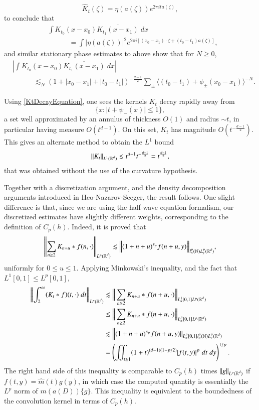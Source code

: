 \[ \widehat{K}_t(\zeta) = \eta(a(\zeta)) e^{2 \pi i t a(\zeta)}, \]
%
to conclude that
%
\begin{align*}
    &\int K_{t_0}(x - x_0) \overline{K_{t_1}(x - x_1)}\; dx\\
    &\quad\quad\quad= \int |\eta(a(\zeta))|^2 e^{2 \pi i [ (x_0 - x_1) \cdot \zeta + (t_0 - t_1) a(\zeta) ]},
\end{align*}
%
and similar stationary phase estimates to above show that for $N \geq 0$,
%
\begin{align*}
    & \left| \int K_{t_0}(x - x_0) \overline{K_{t_1}(x - x_1)}\; dx \right|\\
    &\quad\quad\quad \lesssim_N (1 + |x_0 - x_1| + |t_0 - t_1|)^{- \frac{d-1}{2}} \sum_{\pm} \langle (t_0 - t_1) + \phi_{\pm}(x_0 - x_1) \rangle^{-N}.
\end{align*}

\begin{remark}
    Using \eqref{KtDecayEquation}, one sees the kernels $K_t$ decay rapidly away from
    \[ \{ x : |t + \psi_-(x)| \leq 1 \}, \]
    a set well approximated by an annulus of thickness $O(1)$ and radius $\sim t$, in particular having measure $O(t^{d-1})$. On this set, $K_t$ has magnitude $O(t^{-\frac{d-1}{2}})$. This gives an alternate method to obtain the $L^1$ bound
    \[ \| K_t \|_{L^1(\operatorname{\mathbb{R}}^d)} \lesssim t^{d-1} t^{- \frac{d-1}{2}} = t^{\frac{d-1}{2}}, \]
    that was obtained without the use of the curvature hypothesis.
\end{remark}

Together with a discretization argument, and the density decomposition arguments introduced in Heo-Nazarov-Seeger, the result follows. One slight difference is that, since we are using the half-wave equation formalism, our discretized estimates have slightly different weights, corresponding to the definition of $C_p(h)$. Indeed, it is proved that
%
\[ \left\| \sum_{n \geq 2} K_{n + u} * f(n, \cdot) \right\|_{L^p(\operatorname{\mathbb{R}}^d)} \lesssim \Big\| (1 + n + u)^{s_p} f(n + u,y) \Big\|_{l^p_n(\operatorname{\mathbb{N}}) L^p_y(\operatorname{\mathbb{R}}^d)}, \]
%
uniformly for $0 \leq u \leq 1$. Applying Minkowski's inequality, and the fact that $L^1[0,1] \leq L^p[0,1]$,
%
\begin{align*}
    \left\| \int_2^\infty (K_t * f)(t, \cdot)\; dt \right\|_{L^p(\operatorname{\mathbb{R}}^d)} & \lesssim \Big\| \sum_{n \geq 2} K_{n + u} * f(n+u,\cdot) \Big\|_{L^1_u[0,1] L^p(\operatorname{\mathbb{R}}^d)}\\
    &\leq \Big\| \sum_{n \geq 2} K_{n + u} * f(n+u,\cdot) \Big\|_{L^p_u[0,1] L^p(\operatorname{\mathbb{R}}^d)}\\
    &\lesssim \Big\| (1 + n+u)^{s_p} f(n + u,y) \|_{L^p_u[0,1] l^p_n(\operatorname{\mathbb{N}}) L^p_y(\operatorname{\mathbb{R}}^d)}\\
    &= \left( \iint_{t \geq 1} (1 + t)^{(d-1)(1 - p/2)} |f(t,y)|^p\; dt\; dy \right)^{1/p}.
\end{align*}
%
The right hand side of this inequality is comparable to $C_p(h)$ times $\| g \|_{L^p(\operatorname{\mathbb{R}}^d)}$ if $f(t,y) = \widehat{m}(t) g(y)$, in which case the computed quantity is essentially the $L^p$ norm of $m(a(D)) \{ g \}$. This inequality is equivalent to the boundedness of the convolution kernel in terms of $C_p(h)$.

